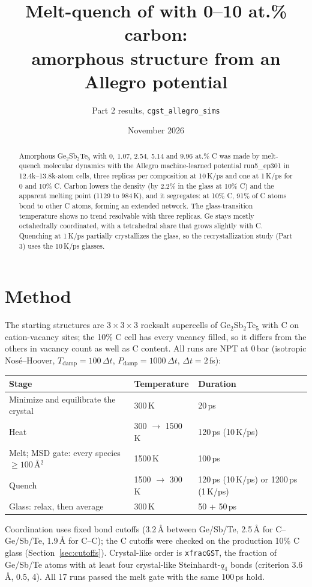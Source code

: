 \documentclass[11pt]{article}
\title{Melt-quench of \GST{} with 0--10 at.\% carbon:\\ amorphous structure from an Allegro potential}
\author{Part 2 results, \texttt{cgst\_allegro\_sims}}
\date{November 2026}
\newcommand{\GST}{Ge$_2$Sb$_2$Te$_5$}
\begin{document}
\maketitle

\begin{abstract}
Amorphous \GST{} with 0, 1.07, 2.54, 5.14 and 9.96 at.\% C was made by melt-quench molecular dynamics with the Allegro
machine-learned potential run5\_ep301 in 12.4k--13.8k-atom cells, three replicas per composition at 10\,K/ps and one
at 1\,K/ps for 0 and 10\% C. Carbon lowers the density (by 2.2\% in the glass at 10\% C) and the apparent melting
point (1129 to 984\,K), and it segregates: at 10\% C, 91\% of C atoms bond to other C atoms, forming an extended
network. The glass-transition temperature shows no trend resolvable with three replicas. Ge stays mostly
octahedrally coordinated, with a tetrahedral share that grows slightly with C. Quenching at 1\,K/ps partially
crystallizes the glass, so the recrystallization study (Part 3) uses the 10\,K/ps glasses.
\end{abstract}

\section{Method}
The starting structures are $3\times3\times3$ rocksalt supercells of \GST{} with C on cation-vacancy sites; the
10\% C cell has every vacancy filled, so it differs from the others in vacancy count as well as C content. All runs
are NPT at 0\,bar (isotropic Nos\'e--Hoover, $T_\text{damp}=100\,\Delta t$, $P_\text{damp}=1000\,\Delta t$,
$\Delta t=2$\,fs):

\begin{table}[H]
\centering
\begin{tabular}{lll}
\toprule
Stage & Temperature & Duration \\
\midrule
Minimize and equilibrate the crystal & 300\,K & 20\,ps \\
Heat & 300 $\to$ 1500\,K & 120\,ps (10\,K/ps) \\
Melt; MSD gate: every species $\geq 100$\,\AA$^2$ & 1500\,K & 100\,ps \\
Quench & 1500 $\to$ 300\,K & 120\,ps (10\,K/ps) or 1200\,ps (1\,K/ps) \\
Glass: relax, then average & 300\,K & 50 + 50\,ps \\
\bottomrule
\end{tabular}
\end{table}

Coordination uses fixed bond cutoffs (3.2\,\AA{} between Ge/Sb/Te, 2.5\,\AA{} for C--Ge/Sb/Te, 1.9\,\AA{} for C--C);
the C cutoffs were checked on the production 10\% C glass (Section~\ref{sec:cutoffs}). Crystal-like order is
\texttt{xfracGST}, the fraction of Ge/Sb/Te atoms with at least four crystal-like Steinhardt-$q_4$ bonds (criterion
3.6\,\AA, 0.5, 4). All 17 runs passed the melt gate with the same 100\,ps hold.
\end{document}
